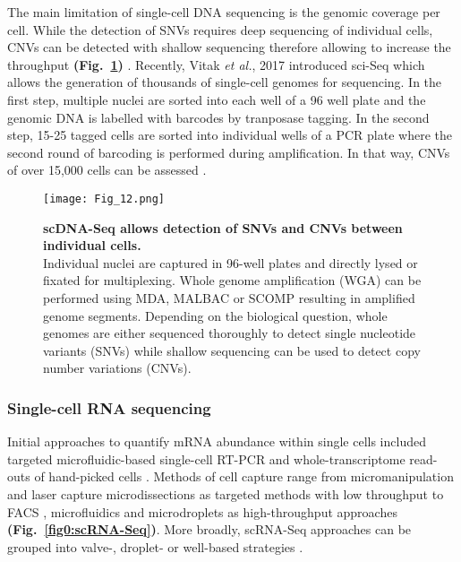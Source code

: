 The main limitation of single-cell DNA sequencing is the genomic coverage per cell. While the detection of SNVs requires deep sequencing of individual cells, CNVs can be detected with shallow sequencing therefore allowing to increase the throughput \textbf{(Fig.~\ref{fig0:scDNA-Seq})} \citep{Knouse2016, Baslan2015}. Recently, Vitak \emph{et al.}, 2017 introduced \gls{sci-Seq} which allows the generation of thousands of single-cell genomes for sequencing. In the first step, multiple nuclei are sorted into each well of a 96 well plate and the genomic DNA is labelled with barcodes by tranposase tagging. In the second step, 15-25 tagged cells are sorted into individual wells of a PCR plate where the second round of barcoding is performed during amplification. In that way, CNVs of over 15,000 cells can be assessed \citep{Vitak2017}.

\begin{figure}[!h]
\centering
\texttt{[image: Fig\_12.png]}
\caption[\Gls{scDNA-Seq} allows detection of SNVs and CNVs between individual cells]{\textbf{\Gls{scDNA-Seq} allows detection of SNVs and CNVs between individual cells.}\\
Individual nuclei are captured in 96-well plates and directly lysed or fixated for multiplexing. Whole genome amplification (WGA) can be performed using MDA, MALBAC or SCOMP resulting in amplified genome segments. Depending on the biological question, whole genomes are either sequenced thoroughly to detect single nucleotide variants (SNVs) while shallow sequencing can be used to detect copy number variations (CNVs).}
\label{fig0:scDNA-Seq}
\end{figure}

\vspace{-5mm}

\subsubsection{Single-cell RNA sequencing}

Initial approaches to quantify mRNA abundance within single cells included targeted microfluidic-based single-cell RT-PCR \citep{Warren2006} and whole-transcriptome read-outs of hand-picked cells \citep{Tang2009}. Methods of cell capture range from micromanipulation \citep{Grindberg2014} and laser capture microdissections \citep{Frumkin2008} as targeted methods with low throughput to  \gls{FACS} \citep{Hayashi2010, Dalerba2011, Jaitin2014}, microfluidics \citep{Trapnell2014, Treutlein2014} and microdroplets \citep{Klein2015, Macosko2015} as high-throughput approaches \textbf{(Fig.~\ref{fig0:scRNA-Seq})}. More broadly, \gls{scRNA-Seq} approaches can be grouped into valve-, droplet- or well-based strategies \citep{Prakadan2017}. \\

